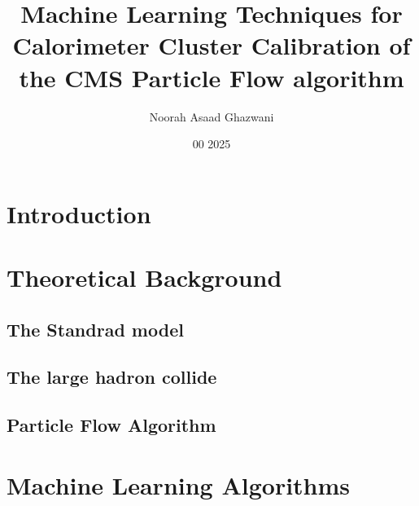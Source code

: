 \documentclass
[
]
{thesis}
\title{Machine Learning Techniques for Calorimeter Cluster Calibration of the CMS Particle Flow algorithm}
\author{Noorah Asaad Ghazwani}
\date{00 2025}
\begin{document}

\setlength{\belowdisplayskip}{1ex} \setlength{\belowdisplayshortskip}{1ex}
\setlength{\abovedisplayskip}{1ex} \setlength{\abovedisplayshortskip}{1ex}


\chapter{Introduction}

\chapter{Theoretical Background} 

\section{The Standrad model}


\section{The large hadron collide}



\section{Particle Flow Algorithm}
 

\chapter{Machine Learning Algorithms}
   
\end{document}
